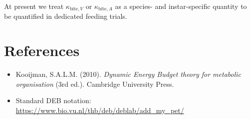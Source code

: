 \documentclass[11pt]{article}
\begin{document}
At present we treat $\kappa_{\text{bite},V}$ or $\kappa_{\text{bite},A}$ as a species- and instar-specific quantity to be quantified in dedicated feeding trials.

\section*{References}

\begin{itemize}
  \item Kooijman, S.A.L.M. (2010). \emph{Dynamic Energy Budget theory for metabolic organisation} (3rd ed.). Cambridge University Press.
  \item Standard DEB notation: \url{https://www.bio.vu.nl/thb/deb/deblab/add_my_pet/}
\end{itemize}
\end{document}
